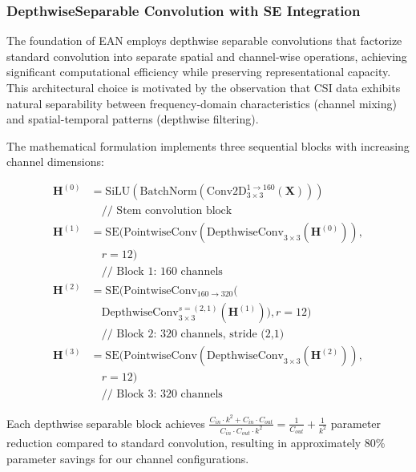 \documentclass[lettersize,journal]{IEEEtran}
\begin{document}
\subsubsection{DepthwiseSeparable Convolution with SE Integration}

The foundation of EAN employs depthwise separable convolutions that factorize standard convolution into separate spatial and channel-wise operations, achieving significant computational efficiency while preserving representational capacity. This architectural choice is motivated by the observation that CSI data exhibits natural separability between frequency-domain characteristics (channel mixing) and spatial-temporal patterns (depthwise filtering).

The mathematical formulation implements three sequential blocks with increasing channel dimensions:

\begin{tcolorbox}[colback=gray!5!white,colframe=gray!50!black,title=\textbf{EAN Architecture Formulation}]
\begin{align}
\mathbf{H}^{(0)} &= \text{SiLU}(\text{BatchNorm}(\text{Conv2D}_{3\times3}^{1\rightarrow160}(\mathbf{X}))) \nonumber\\
&\quad \text{// Stem convolution block} \nonumber\\[0.5em]
\mathbf{H}^{(1)} &= \text{SE}(\text{PointwiseConv}(\text{DepthwiseConv}_{3\times3}(\mathbf{H}^{(0)})), \nonumber\\
&\quad r=12) \nonumber\\
&\quad \text{// Block 1: 160 channels} \nonumber\\[0.5em]
\mathbf{H}^{(2)} &= \text{SE}(\text{PointwiseConv}_{160\rightarrow320}( \nonumber\\
&\quad \text{DepthwiseConv}_{3\times3}^{s=(2,1)}(\mathbf{H}^{(1)})), r=12) \nonumber\\
&\quad \text{// Block 2: 320 channels, stride (2,1)} \nonumber\\[0.5em]
\mathbf{H}^{(3)} &= \text{SE}(\text{PointwiseConv}(\text{DepthwiseConv}_{3\times3}(\mathbf{H}^{(2)})), \nonumber\\
&\quad r=12) \\
&\quad \text{// Block 3: 320 channels} \nonumber
\end{align}
\end{tcolorbox}

Each depthwise separable block achieves $\frac{C_{in} \cdot k^2 + C_{in} \cdot C_{out}}{C_{in} \cdot C_{out} \cdot k^2} = \frac{1}{C_{out}} + \frac{1}{k^2}$ parameter reduction compared to standard convolution, resulting in approximately 80\% parameter savings for our channel configurations.
\end{document}

